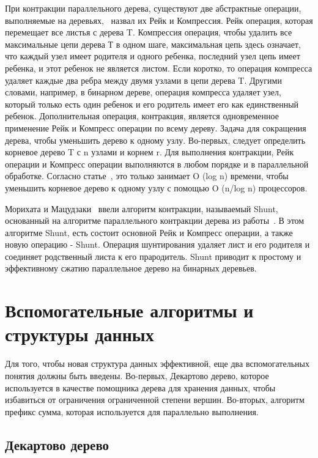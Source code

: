 \documentclass[specification,annotation]{itmo-student-thesis}
\newcommand{\revise}[1]{{\color{red!70!black} #1 }}
\begin{document}
\revise{
При контракции параллельного дерева, существуют две абстрактные операции, выполняемые на деревьях,~\cite{miller85} назвал их Рейк и Компрессия. Рейк операция, которая перемещает все листья с 
дерева T. Компрессия операция, чтобы удалить все максимальные цепи дерева Т в одном шаге, максимальная цепь здесь означает, что каждый узел имеет родителя и одного ребенка, последний узел цепь имеет 
ребенка, и этот ребенок не является листом. Если коротко, то операция компресса удаляет каждые два ребра между двумя узлами в цепи дерева T. Другими словами, например, в бинарном дереве, операция 
компресса удаляет узел, который только есть один ребенок и его родитель имеет его как единственный ребенок. Дополнительная операция, контракция, является одновременное применение Рейк и Компресс операции 
по всему дереву. Задача для сокращения дерева, чтобы уменьшить дерево к одному узлу. Во-первых, следует определить корневое дерево T с n узлами и корнем r. Для выполнения контракции, Рейк операции и 
Компресс операции выполняются в любом порядке и в параллельной обработке. Согласно статье~\cite{miller85}, это только занимает O (log n) времени, чтобы уменьшить корневое дерево к одному узлу с 
помощью O (n/log n) процессоров.
}

\revise{
Морихата и Мацудзаки~\cite{morihata08} ввели алгоритм контракции, называемый Shunt, основанный на алгоритме параллельного контракции дерева из работы~\cite{miller85}. В этом алгоритме Shunt, 
есть состоит основной Рейк 
и Компресс операции, а также новую операцию - Shunt. Операция шунтирования удаляет лист и его родителя и соединяет родственный листа к его прародитель. Shunt приводит к простому и эффективному сжатию 
параллельное дерево на бинарных деревьев.
}

\section{Вспомогательные алгоритмы и структуры данных}\label{survey-misc}

\revise{
Для того, чтобы новая структура данных эффективной, еще два вспомогательных понятия должны быть введены. Во-первых, Декартово дерево, которое используется в качестве помощника дерева для хранения данных, 
чтобы избавиться от ограничения ограниченной степени вершин. Во-вторых, алгоритм префикс сумма, которая используется для параллельно выполнения.
}

\subsection{Декартово дерево}
\end{document}
